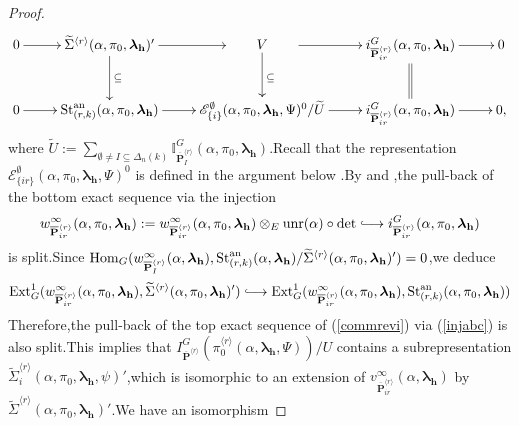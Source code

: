 \documentclass[SecEq,CM,GP]{degruyter-crelle} %
\theoremstyle{plain}
\newcommand{\hooklongrightarrow}{\lhook\joinrel\longrightarrow}
\newcommand{\ana}{{\rm an}}
\newcommand{\dett}{{\rm det}}
\newcommand{\ext}{{\rm Ext}}
\newcommand{\homo}{{\rm Hom}}
\newcommand{\lrr}{{\langle r\rangle}}
\newcommand{\op}{{\overline{{\mathbf{P}}}}}
\newcommand{\st}{{\rm St}}
\newcommand{\unr}{{\rm unr}}
\newcommand{\BI}{{\mathbb{I}}}
\newcommand{\bh}{{\mathbf{h}}}
\newcommand{\sE}{\mathscr E}
\begin{document}
\begin{proof}
\begin{equation}
	\xymatrix{0 \ar[r] & \widetilde{\Sigma}^{\lrr}(\alpha,\pi_0, {\bm\lambda}_\bh)' \ar[d]^{\subseteq}  \ar[r] & \hspace{20pt}V\hspace{20pt} \ar[d]^{\subseteq} \ar[r] & i_{\op^{\lrr}_{ir}}^{G}(\alpha,\pi_0,{\bm\lambda}_\bh) \ar@{=}[d] \ar[r] & 0  \\
		0 \ar[r] &\st_{(r,k)}^{\ana}(\alpha,\pi_0, {\bm\lambda}_\bh) \ar[r] & \sE_{\{i\}}^\emptyset(\alpha,\pi_0,{\bm\lambda}_\bh,\Psi)^0/\widetilde{U} \ar[r] & i_{\op^{\lrr}_{ir}}^{G}(\alpha,\pi_0,{\bm\lambda}_\bh)\ar[r]&0,}
\end{equation}
where $\widetilde{U}:=\sum_{\emptyset\neq I\subseteq \Delta_n(k)} \BI_{\op^{\lrr}_I}^G(\alpha,\pi_0, {\bm\lambda}_\bh)$.\;Recall that the representation
$\sE_{\{ir\}}^\emptyset(\alpha,\pi_0,{\bm\lambda}_\bh,\Psi)^0$ is defined in the argument below \cite[Theorem 5.19]{2022ext1hyq}.\;By \cite[Theorem 5.19]{2022ext1hyq} and \cite[Remark 5.21]{2022ext1hyq},\;the pull-back of the bottom exact sequence via the injection
\begin{equation}\label{injabc}
	w_{\op^{\lrr}_{ir}}^{\infty}(\alpha,\pi_0,{\bm\lambda}_\bh):=w_{\op^{\lrr}_{ir}}^{\infty}(\alpha,\pi_0,{\bm\lambda}_\bh)\otimes_E \unr(\alpha)\circ \dett\hooklongrightarrow i_{\op^{\lrr}_{ir}}^G(\alpha,\pi_0, {\bm\lambda}_\bh)\end{equation}
is split.\;Since $\homo_G(w_{\op^{\lrr}_I}^{\infty}(\alpha,{\bm\lambda}_\bh), \st_{(r,k)}^{\ana}(\alpha,{\bm\lambda}_\bh)/\widetilde{\Sigma}^{\lrr}(\alpha,\pi_0, {\bm\lambda}_\bh)')=0$,\;we deduce
\begin{equation*}\ext^1_G(w_{\op^{\lrr}_{ir}}^{\infty}(\alpha,\pi_0,{\bm\lambda}_\bh), \widetilde{\Sigma}^{\lrr}(\alpha,\pi_0, {\bm\lambda}_\bh)')\hooklongrightarrow \ext^1_G(w_{\op^{\lrr}_{ir}}^{\infty}(\alpha,\pi_0,{\bm\lambda}_\bh),\st_{(r,k)}^{\ana}(\alpha,\pi_0,{\bm\lambda}_\bh))
\end{equation*}
Therefore,\;the pull-back of the top exact sequence of (\ref{commrevi}) via (\ref{injabc}) is also split.\;This implies that
$I_{\op^{\lrr}}^G (\pi_0^{\lrr}(\alpha,{\bm\lambda}_\bh,\Psi))/U$ contains a subrepresentation $\widetilde{\Sigma}_i^{\lrr}(\alpha,\pi_0, {\bm\lambda}_\bh, \psi)'$,\;which is isomorphic to an extension of $v_{\op^{\lrr}_{ir}}^{\infty}(\alpha,{\bm\lambda}_\bh)$ by $\widetilde{\Sigma}^{\lrr}(\alpha,\pi_0, {\bm\lambda}_\bh)'$.\;We have an isomorphism

\end{proof}
\end{document}
